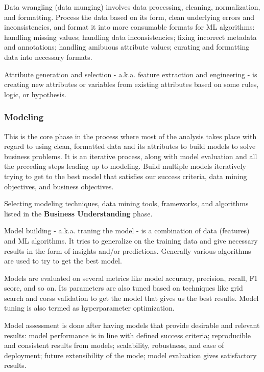 Data wrangling (data munging) involves data processing, cleaning,
normalization, and formatting. Process the data based on its form, clean
underlying errors and inconsistencies, and format it into more
consumable formats for ML algorithms: handling missing values; handling
data inconsistencies; fixing incorrect metadata and annotations;
handling amibuous attribute values; curating and formatting data into
necessary formats.

Attribute generation and selection - a.k.a. feature extraction and
engineering - is creating new attributes or variables from existing
attributes based on some rules, logic, or hypothesis.

\hypertarget{modeling}{%
\subsubsection{Modeling}\label{modeling}}

This is the core phase in the process where most of the analysis takes
place with regard to using clean, formatted data and its attributes to
build models to solve business problems. It is an iterative process,
along with model evaluation and all the preceding steps leading up to
modeling. Build multiple models iteratively trying to get to the best
model that satisfies our success criteria, data mining objectives, and
business objectives.

Selecting modeling techniques, data mining tools, frameworks, and
algorithms listed in the \textbf{Business Understanding} phase.

Model building - a.k.a. traning the model - is a combination of data
(features) and ML algorithms. It tries to generalize on the training
data and give necessary results in the form of insights and/or
predictions. Generally various algorithms are used to try to get the
best model.

Models are evaluated on several metrics like model accuracy, precision,
recall, F1 score, and so on. Its parameters are also tuned based on
techniques like grid search and corss validation to get the model that
gives us the best results. Model tuning is also termed as hyperparameter
optimization.

Model assessment is done after having models that provide desirable and
relevant results: model performance is in line with defined success
criteria; reproducible and consistent results from models; scalability,
robustness, and ease of deployment; future extensibility of the mode;
model evaluation gives satisfactory results.

